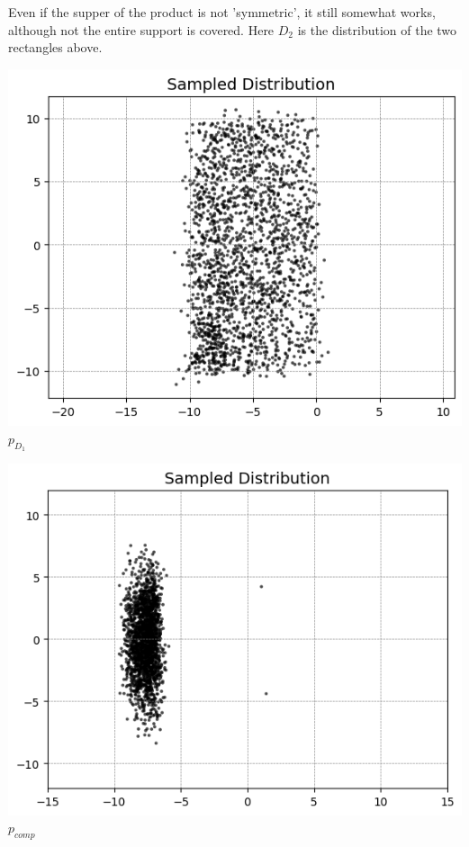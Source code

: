 \documentclass{article}
\begin{document}
\newpage
Even if the supper of the product is not 'symmetric', it still somewhat works, although not the entire support is covered. 
Here $D_2$ is the distribution of the two rectangles above. 
\begin{center}
  \begin{minipage}{0.4\textwidth}
    \includegraphics[width=\linewidth]{images_guidance1/Rectangleforaddedscores2.png}
    \centering\small $p_{D_1}$
  \end{minipage}
  \hfill
  \begin{minipage}{0.4\textwidth}
    \includegraphics[width=\linewidth]{images_guidance1/addedscores2.png}
    \centering\small $p_{comp}$
  \end{minipage}
  \hfill
  \end{center}
\end{document}
